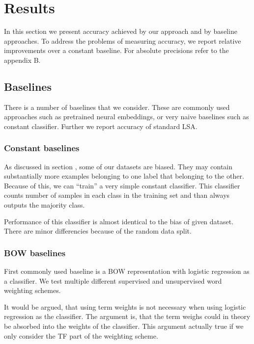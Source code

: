 \section{Results}
    In this section we present accuracy achieved by our approach and by baseline approaches.
    To address the problems of measuring accuracy, we report relative improvements over a constant baseline.
    For absolute precisions refer to the appendix B. 

    \subsection{Baselines} \label{sec:baseline}

    There is a number of baselines that we consider.
    These are commonly used approaches such as pretrained neural embeddings, or very naive baselines such as constant classifier.
    Further we report accuracy of standard LSA.

    \subsubsection{Constant baselines}
    As discussed in section \label{sec:data:overview}, some of our datasets are biased. 
    They may contain substantially more examples belonging to one label that belonging to the other.
    Because of this, we can ``train'' a very simple constant classifier. 
    This classifier counts number of samples in each class in the training set and than always outputs the majority class.
    
    Performance of this classifier is almost identical to the bias of given dataset. 
    There are minor differencies because of the random data split. 
    
    \subsubsection{BOW baselines}    
    
    First commonly used baseline is a BOW representation with logistic regression as a classifier. 
    We test multiple different supervised and unsupervised word weighting schemes.
    
    It would be argued, that using term weights is not necessary when using logistic regression as the classifier.
    The argument is, that the term weighs could in theory be absorbed into the weights of the classifier. 
    This argument actually true if we only consider the TF part of the weighting scheme.
    
